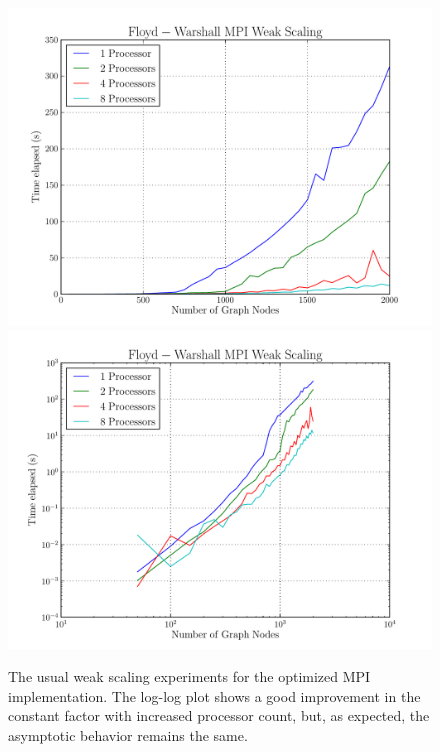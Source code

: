 \documentclass[12pt]{article}
\begin{document}
\begin{figure}
  \centering
  \includegraphics[scale=0.7]{../profiling/mpi_linear_weak.pdf}
  \includegraphics[scale=0.7]{../profiling/mpi_log_weak.pdf}
  \caption{The usual weak scaling experiments for the optimized MPI
    implementation. The log-log plot shows a good improvement in the
    constant factor with increased processor count, but, as expected,
    the asymptotic behavior remains the same.}
\end{figure}
\end{document}
